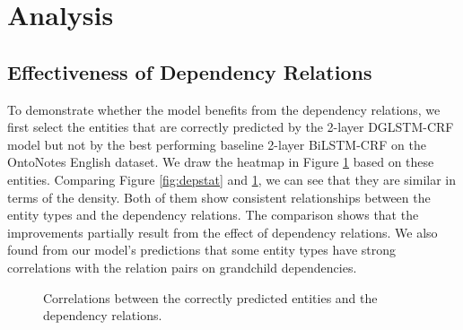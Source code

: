 








\section{Analysis}
\label{sec:analysis}
\subsection{Effectiveness of Dependency Relations}
To demonstrate whether the model benefits from the dependency relations, we first select the entities that are correctly predicted by the 2-layer DGLSTM-CRF model but not by the best performing baseline 2-layer BiLSTM-CRF on the OntoNotes English dataset. 
We draw the heatmap in Figure \ref{fig:deprelana} based on these entities.  
Comparing Figure \ref{fig:depstat} and \ref{fig:deprelana}, we can see that they are similar in terms of the density. 
Both of them show consistent relationships between the entity types and the dependency relations. 
The comparison shows that the improvements partially result from the effect of dependency relations. 
We also found from our model's predictions that some entity types have strong correlations with the relation pairs on grandchild dependencies. 

\begin{figure}[h!]
	\centering
	\caption{Correlations between the correctly predicted entities and the dependency relations.}
	\label{fig:deprelana}
\end{figure}

